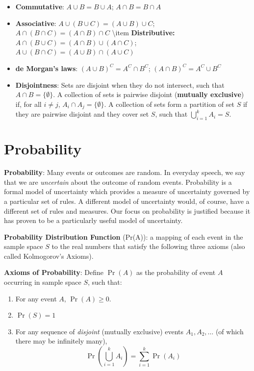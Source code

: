 \documentclass[]{book}
\providecommand{\tightlist}{%
  \setlength{\itemsep}{0pt}\setlength{\parskip}{0pt}}
\theoremstyle{definition}
\theoremstyle{definition}
\theoremstyle{definition}
\theoremstyle{remark}
\begin{document}
\begin{itemize}
\tightlist
\item
  \textbf{Commutative}: \(A \cup B = B \cup A\); \(A \cap B = B \cap A\)
\item
  \textbf{Associative}: \(A \cup (B \cup C) = (A \cup B) \cup C\);
  \(A \cap (B \cap C) = (A \cap B) \cap C\) \textbackslash{}item
  \textbf{Distributive: }\(A \cap (B \cup C) = (A \cap B) \cup (A \cap C)\);
  \(A \cup (B \cap C) = (A \cup B) \cap (A \cup C)\)
\item
  \textbf{de Morgan's laws}: \((A \cup B)^C = A^C \cap B^C\);
  \((A \cap B)^C = A^C \cup B^C\)
\item
  \textbf{Disjointness}: Sets are disjoint when they do not intersect,
  such that \(A \cap B = \{\emptyset\}\). A collection of sets is
  pairwise disjoint (\textbf{mutually exclusive}) if, for all
  \(i \neq j\), \(A_i \cap A_j = \{\emptyset\}\). A collection of sets
  form a partition of set \(S\) if they are pairwise disjoint and they
  cover set \(S\), such that \(\bigcup_{i = 1}^k A_i = S\).
\end{itemize}

\section{Probability}\label{probability-1}

\textbf{Probability}: Many events or outcomes are random. In everyday
speech, we say that we are \emph{uncertain} about the outcome of random
events. Probability is a formal model of uncertainty which provides a
measure of uncertainty governed by a particular set of rules. A
different model of uncertainty would, of course, have a different set of
rules and measures. Our focus on probability is justified because it has
proven to be a particularly useful model of uncertainty.

\textbf{Probability Distribution Function} (Pr(A)): a mapping of each
event in the sample space \(S\) to the real numbers that satisfy the
following three axioms (also called Kolmogorov's Axioms).

\textbf{Axioms of Probability}: Define \(\Pr(A)\) as the probability of
event \(A\) occurring in sample space \(S\), such that:

\begin{enumerate}
\def\labelenumi{\arabic{enumi}.}
\tightlist
\item
  For any event \(A\), \(\Pr(A)\ge 0\).
\item
  \(\Pr(S)=1\)
\item
  For any sequence of \textit{disjoint} (mutually exclusive) events
  \(A_1,A_2,\ldots\) (of which there may be infinitely many),
  \[\Pr\left( \bigcup\limits_{i=1}^k
  A_i\right)=\sum\limits_{i=1}^k \Pr(A_i)\]
\end{enumerate}
\end{document}
